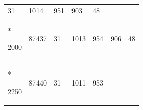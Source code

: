 \documentclass[
  12pt,
  oneside,
  openany]{book}
\begin{document}
\begin{appendices}
\begin{singlespace}
\begin{longtable}[]{@{}lllllll@{}}
\begin{minipage}[t]{0.16\columnwidth}
31\strut
\end{minipage} & \begin{minipage}[t]{0.11\columnwidth}\raggedright
1014\strut
\end{minipage} & \begin{minipage}[t]{0.07\columnwidth}\raggedright
951\strut
\end{minipage} & \begin{minipage}[t]{0.07\columnwidth}\raggedright
903\strut
\end{minipage} & \begin{minipage}[t]{0.10\columnwidth}\raggedright
48\strut
\end{minipage}\tabularnewline*
\begin{minipage}[t]{0.13\columnwidth}\raggedright
2000\strut
\end{minipage} & \begin{minipage}[t]{0.16\columnwidth}\raggedright
87437\strut
\end{minipage} & \begin{minipage}[t]{0.16\columnwidth}\raggedright
31\strut
\end{minipage} & \begin{minipage}[t]{0.11\columnwidth}\raggedright
1013\strut
\end{minipage} & \begin{minipage}[t]{0.07\columnwidth}\raggedright
954\strut
\end{minipage} & \begin{minipage}[t]{0.07\columnwidth}\raggedright
906\strut
\end{minipage} & \begin{minipage}[t]{0.10\columnwidth}\raggedright
48\strut
\end{minipage}\tabularnewline*
\begin{minipage}[t]{0.13\columnwidth}\raggedright
2250\strut
\end{minipage} & \begin{minipage}[t]{0.16\columnwidth}\raggedright
87440\strut
\end{minipage} & \begin{minipage}[t]{0.16\columnwidth}\raggedright
31\strut
\end{minipage} & \begin{minipage}[t]{0.11\columnwidth}\raggedright
1011\strut
\end{minipage} & \begin{minipage}[t]{0.07\columnwidth}\raggedright
953\strut
\end{minipage} & \begin{minipage}[t]{0.07\columnwidth}\raggedright

\end{minipage}
\end{longtable}
\end{singlespace}
\end{appendices}
\end{document}
